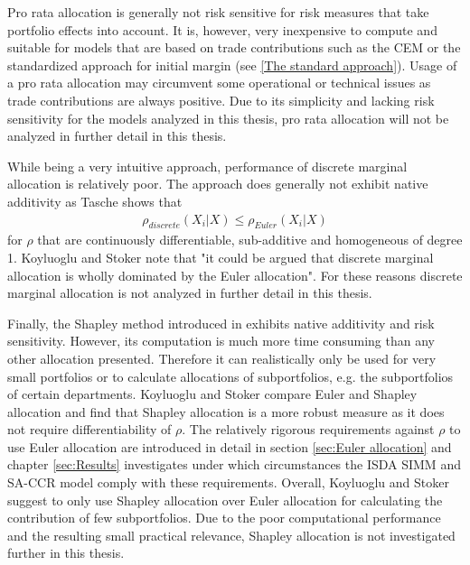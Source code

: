 \documentclass[../Thesis_AHoecherl.tex]{subfiles}
\begin{document}
Pro rata allocation is generally not risk sensitive for risk measures that take portfolio effects into account.
It is, however, very inexpensive to compute and suitable for models that are based on trade contributions such as the \gls{CEM} or the standardized approach for initial margin (see \ref{The standard approach}).
Usage of a pro rata allocation may circumvent some operational or technical issues as trade contributions are always positive.
Due to its simplicity and lacking risk sensitivity for the models analyzed in this thesis, pro rata allocation will not be analyzed in further detail in this thesis.

While being a very intuitive approach, performance of discrete marginal allocation is relatively poor. The approach does generally not exhibit native additivity as Tasche \cite{tasche2007} shows that 
\begin{align*}
    \rho_{discrete}\left(X_i|X\right) \leq \rho_{Euler}\left(X_i|X\right)
\end{align*}
for $\rho$ that are continuously differentiable, sub-additive and homogeneous of degree 1. 
Koyluoglu and Stoker \cite{koyluoglu2002risk} note that "it could be argued that discrete marginal allocation is wholly dominated by the Euler allocation". For these reasons discrete marginal allocation is not analyzed in further detail in this thesis.

Finally, the Shapley method introduced in \cite{shapley1951} exhibits native additivity and risk sensitivity.
However, its computation is much more time consuming than any other allocation presented. 
Therefore it can realistically only be used for very small portfolios or to calculate allocations of subportfolios, e.g. the subportfolios of certain departments.
Koyluoglu and Stoker \cite{koyluoglu2002risk} compare Euler and Shapley allocation and find that Shapley allocation is a more robust measure as it does not require differentiability of $\rho$. The relatively rigorous requirements against $\rho$ to use Euler allocation are introduced in detail in section \ref{sec:Euler allocation} and chapter \ref{sec:Results} investigates under which circumstances the \gls{ISDA SIMM} and \gls{SA-CCR} model comply with these requirements.
Overall, Koyluoglu and Stoker suggest to only use Shapley allocation over Euler allocation for calculating the contribution of few subportfolios.
Due to the poor computational performance and the resulting small practical relevance, Shapley allocation is not investigated further in this thesis.
\end{document}
